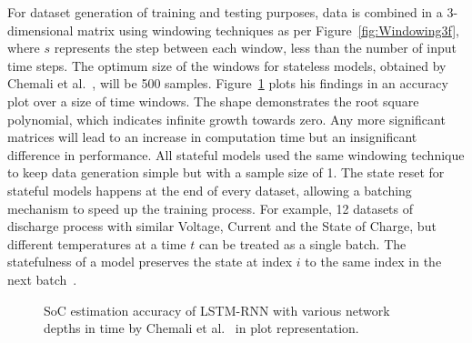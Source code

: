 %
%
For dataset generation of training and testing purposes, data is combined in a 3-dimensional matrix using windowing techniques as per Figure~\ref{fig:Windowing3f}, where $s$ represents the step between each window, less than the number of input time steps.
The optimum size of the windows for stateless models, obtained by Chemali et al.~\cite{Chemali2017}, will be 500 samples.
Figure~\ref{fig:chemali-accuracy} plots his findings in an accuracy plot over a size of time windows.
The shape demonstrates the root square polynomial, which indicates infinite growth towards zero.
Any more significant matrices will lead to an increase in computation time but an insignificant difference in performance.
All stateful models used the same windowing technique to keep data generation simple but with a sample size of 1.
The state reset for stateful models happens at the end of every dataset, allowing a batching mechanism to speed up the training process.
For example, 12 datasets of discharge process with similar Voltage, Current and the State of Charge, but different temperatures at a time $t$ can be treated as a single batch.
The statefulness of a model preserves the state at index $i$ to the same index in the next batch~\cite{zhu_statefulnes_tfdocs_2020}.
\begin{figure}[htbp]
    \centering
    
    \caption{SoC estimation accuracy of LSTM-RNN with various network depths in time by Chemali et al.~\cite{Chemali2017} in plot representation.}
    \label{fig:chemali-accuracy}
\end{figure}

